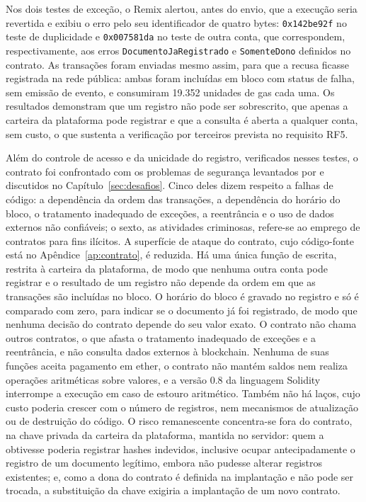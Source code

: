 \documentclass[
    12pt,
    a4paper,
    oneside,
    chapter=TITLE,
    section=TITLE,
    subsection=TITLE,
    subsubsection=TITLE,
    sumario=tradicional,
    english,
    brazil
]{abntex2}
\begin{document}
Nos dois testes de exceção, o Remix alertou, antes do envio, que a execução seria revertida e exibiu o erro pelo seu identificador de quatro bytes: \texttt{0x142be92f} no teste de duplicidade e \texttt{0x007581da} no teste de outra conta, que correspondem, respectivamente, aos erros \texttt{DocumentoJaRegistrado} e \texttt{SomenteDono} definidos no contrato. As transações foram enviadas mesmo assim, para que a recusa ficasse registrada na rede pública: ambas foram incluídas em bloco com status de falha, sem emissão de evento, e consumiram 19.352 unidades de gas cada uma. Os resultados demonstram que um registro não pode ser sobrescrito, que apenas a carteira da plataforma pode registrar e que a consulta é aberta a qualquer conta, sem custo, o que sustenta a verificação por terceiros prevista no requisito RF5.

Além do controle de acesso e da unicidade do registro, verificados nesses testes, o contrato foi confrontado com os problemas de segurança levantados por  e discutidos no Capítulo~\ref{sec:desafios}. Cinco deles dizem respeito a falhas de código: a dependência da ordem das transações, a dependência do horário do bloco, o tratamento inadequado de exceções, a reentrância e o uso de dados externos não confiáveis; o sexto, as atividades criminosas, refere-se ao emprego de contratos para fins ilícitos. A superfície de ataque do contrato, cujo código-fonte está no Apêndice~\ref{ap:contrato}, é reduzida. Há uma única função de escrita, restrita à carteira da plataforma, de modo que nenhuma outra conta pode registrar e o resultado de um registro não depende da ordem em que as transações são incluídas no bloco. O horário do bloco é gravado no registro e só é comparado com zero, para indicar se o documento já foi registrado, de modo que nenhuma decisão do contrato depende do seu valor exato. O contrato não chama outros contratos, o que afasta o tratamento inadequado de exceções e a reentrância, e não consulta dados externos à blockchain. Nenhuma de suas funções aceita pagamento em ether, o contrato não mantém saldos nem realiza operações aritméticas sobre valores, e a versão 0.8 da linguagem Solidity interrompe a execução em caso de estouro aritmético. Também não há laços, cujo custo poderia crescer com o número de registros, nem mecanismos de atualização ou de destruição do código. O risco remanescente concentra-se fora do contrato, na chave privada da carteira da plataforma, mantida no servidor: quem a obtivesse poderia registrar hashes indevidos, inclusive ocupar antecipadamente o registro de um documento legítimo, embora não pudesse alterar registros existentes; e, como a dona do contrato é definida na implantação e não pode ser trocada, a substituição da chave exigiria a implantação de um novo contrato.
\end{document}
